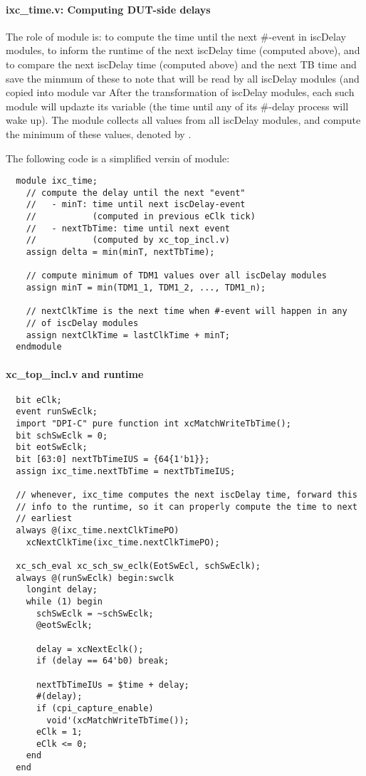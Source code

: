 \documentclass{note}
\begin{document}
\paragraph{ixc\_time.v: Computing DUT-side delays}
The role of  module is:
  \ben
  \w to compute the time until the next \#-event in iscDelay modules, 
  \w to inform the runtime of the next iscDelay time (computed above), and
  \w to compare the next iscDelay time (computed above) and the next TB time
  and save the minmum of these to 
    \bit
    \w note that  will be read by all iscDelay modules
    (and copied into module var 
    \eit
  \een
After the transformation of iscDelay modules, each such module will updazte
its  variable (the time until any of its \#-delay process will wake
up). The  module collects all  values from all iscDelay
modules, and compute the minimum of these values, denoted by
. 

The following code is a simplified versin of  module:
\begin{verbatim}
  module ixc_time;
    // compute the delay until the next "event"
    //   - minT: time until next iscDelay-event 
    //           (computed in previous eClk tick)
    //   - nextTbTime: time until next event
    //           (computed by xc_top_incl.v)
    assign delta = min(minT, nextTbTime);

    // compute minimum of TDM1 values over all iscDelay modules
    assign minT = min(TDM1_1, TDM1_2, ..., TDM1_n);
 
    // nextClkTime is the next time when #-event will happen in any 
    // of iscDelay modules
    assign nextClkTime = lastClkTime + minT;
  endmodule
\end{verbatim}

\paragraph{xc\_top\_incl.v and runtime}
\begin{verbatim}
  bit eClk; 
  event runSwEclk;
  import "DPI-C" pure function int xcMatchWriteTbTime();
  bit schSwEclk = 0;
  bit eotSwEclk;
  bit [63:0] nextTbTimeIUS = {64{1'b1}};
  assign ixc_time.nextTbTime = nextTbTimeIUS;

  // whenever, ixc_time computes the next iscDelay time, forward this
  // info to the runtime, so it can properly compute the time to next
  // earliest
  always @(ixc_time.nextClkTimePO)
    xcNextClkTime(ixc_time.nextClkTimePO);
  
  xc_sch_eval xc_sch_sw_eclk(EotSwEcl, schSwEclk);
  always @(runSwEclk) begin:swclk
    longint delay;
    while (1) begin 
      schSwEclk = ~schSwEclk;
      @eotSwEclk;

      delay = xcNextEclk();
      if (delay == 64'b0) break;
   
      nextTbTimeIUs = $time + delay;
      #(delay);
      if (cpi_capture_enable)
        void'(xcMatchWriteTbTime());
      eClk = 1;
      eClk <= 0;
    end
  end
\end{verbatim}
\end{document}

